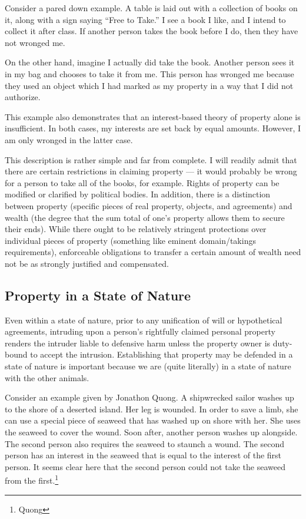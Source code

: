 \documentclass[12pt]{book}
\begin{document}
	Consider a pared down example. A table is laid out with a collection of
	books on it, along with a sign saying “Free to Take.” I see a book I like,
	and I intend to collect it after class. If another person takes the book
	before I do, then they have not wronged me.

	On the other hand, imagine I actually did take the book. Another person
	sees it in my bag and chooses to take it from me. This person has wronged
	me because they used an object which I had marked as my property in a way
	that I did not authorize.

	This example also demonstrates that an interest-based theory of property
	alone is insufficient. In both cases, my interests are set back by equal
	amounts. However, I am only wronged in the latter case.

	This description is rather simple and far from complete. I will readily
	admit that there are certain restrictions in claiming property --- it would
	probably be wrong for a person to take all of the books, for example. Rights
	of property can be modified or clarified by political bodies. In addition,
	there is a distinction between property (specific pieces of real property,
	objects, and agreements) and wealth (the degree that the sum total of one’s
	property allows them to secure their ends). While there ought to be
	relatively stringent protections over individual pieces of property
	(something like eminent domain/takings requirements), enforceable
	obligations to transfer a certain amount of wealth need not be as strongly
	justified and compensated.

	\subsection{Property in a State of Nature}

	Even within a state of nature, prior to any unification of will or
	hypothetical agreements, intruding upon a person’s rightfully claimed
	personal property renders the intruder liable to defensive harm unless the
	property owner is duty-bound to accept the intrusion.  Establishing that
	property may be defended in a state of nature is important because we are
	(quite literally) in a state of nature with the other animals. 

	Consider an example given by Jonathon Quong.  A shipwrecked sailor washes
	up to the shore of a deserted island. Her leg is wounded. In order to save
	a limb, she can use a special piece of seaweed that has washed up on shore
	with her. She uses the seaweed to cover the wound. Soon after, another
	person washes up alongside. The second person also requires the seaweed to
	staunch a wound. The second person has an interest in the seaweed that is
	equal to the interest of the first person. It seems clear here that the
	second person could not take the seaweed from the first.\footnote{Quong}
\end{document}
